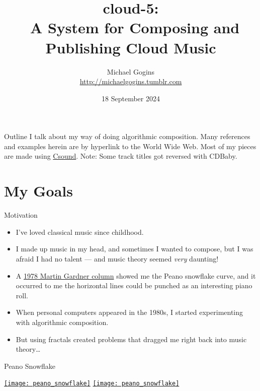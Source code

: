 \documentclass{beamer}
\title[cloud-5] %
{cloud-5: \\\
A System for Composing and Publishing Cloud Music}
\author[Gogins] %
{Michael Gogins \\ \url{http://michaelgogins.tumblr.com} }
\institute[Irreducible Productions] %
{
  Irreducible Productions\\
  New York
}
\date[18 September 2024] %
{18 September 2024}
\begin{document}

\begin{frame}
  \titlepage
\end{frame}

\begin{frame}{Outline}
	I talk about my way of doing algorithmic composition. Many references and examples herein are by hyperlink to the World Wide Web. Most of my pieces are made using \href{http://csound.github.io/}{Csound}. Note: Some track titles got reversed with CDBaby.
  \tableofcontents
\end{frame}

\section{My Goals}

\begin{frame}{Motivation}
	\begin{itemize}
		\item
			I've loved classical music since childhood.
		\item
			I made up music in my head, and sometimes I wanted to compose, but I was afraid I had no talent --- and music theory seemed \emph{very} daunting! 
		\item
			A \href{http://labs.la.utexas.edu/gilden/files/2016/04/Gardner-WhiteBrownFractalMusic.pdf}{1978 Martin Gardner column} showed me the Peano snowflake curve, and it occurred to me the horizontal lines could be punched as an interesting piano roll. 
		\item
			When personal computers appeared in the 1980s, I started experimenting with algorithmic composition.
		\item
			But using fractals created problems that dragged me right back into music theory\dots
	\end{itemize}
\end{frame}

\begin{frame}{Peano Snowflake}
	\begin{center}
            {\href{file:///D:/Dropbox/Michael Gogins/Garden of Algorithms/04-Bending Arches.wav}{\texttt{[image: peano\_snowflake]}}}
            {\href{https://www.youtube.com/watch?v=eJ_d_3wV6i0}{\texttt{[image: peano\_snowflake]}}}
	\end{center}
\end{frame}
\end{document}
